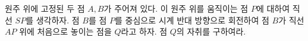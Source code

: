 
\numbering 원주 위에 고정된 두 점 $A,B$가 주어져 있다. 
이 원주 위를 움직이는 점 $P$에 대하여 직선 $SP$를 생각하자. 
점 $B$를 점 $P$를 중심으로 시계 반대 방향으로 회전하여 
점 $B$가 직선 $AP$ 위에 처음으로 놓이는 점을 $Q$라고 하자. 
점 $Q$의 자취를 구하여라. \\


\begin{center}
\end{center}
